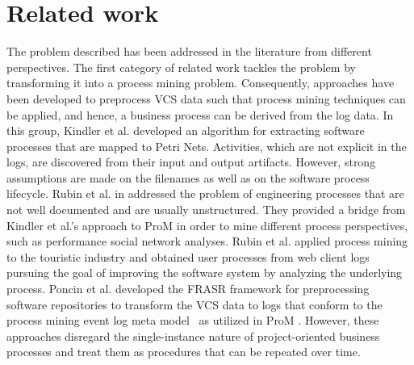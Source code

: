 \section{Related work} 
\label{sec:bpm2015related}

The problem described has been addressed in the literature from different perspectives. The first category of related work tackles the problem by transforming it into a process mining problem. Consequently, approaches have been developed to preprocess VCS data such that process mining techniques can be applied, and hence, a business process can be derived from the log data.
In this group, Kindler et al. \citep{Kindler2006,kindler2006incremental} developed an algorithm for extracting software processes that are mapped to Petri Nets. Activities, which are not explicit in the logs, are discovered from their input and output artifacts. However, strong assumptions are made on the filenames as well as on the software process lifecycle. %
Rubin et al. in \citep{rubin2007process} addressed the problem of engineering processes that are not well documented and are usually unstructured. They provided a bridge from Kindler et al.'s approach to ProM \citep{van2005prom} in order to mine different process perspectives, such as performance social network analyses. %
Rubin et al. \citep{rubin2014agile} applied process mining to the touristic industry and obtained user processes from web client logs pursuing the goal of improving the software system by analyzing the underlying process.
Poncin et al. \citep{Poncin2011a} developed the FRASR framework for preprocessing software repositories to transform the VCS data to logs that conform to the process mining event log meta model~\citep{van2005meta} as utilized in ProM \citep{van2005prom}.
However, these approaches disregard the single-instance nature of project-oriented business processes and treat them as procedures that can be repeated over time.

